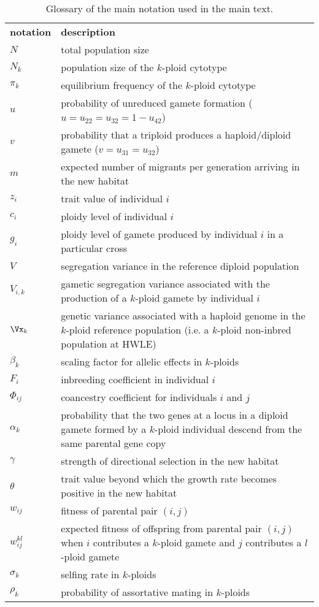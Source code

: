 \documentclass[unnumsec,webpdf,modern,large]{_oup-authoring-template}
\theoremstyle{thmstyleone}%
\theoremstyle{thmstyletwo}%
\theoremstyle{thmstylethree}%
\begin{document}
\begin{table}[t]
\caption{Glossary of the main notation used in the main text.
} \label{tbl:glossary}
\centering
\small
\begin{tabularx}{\linewidth}{lX}
\cline{1-2}
\textbf{notation}   & \textbf{description}   \\ \cline{1-2}
$N$ & total population size\\
$N_k$ & population size of the $k$-ploid cytotype \\
$\pi_k$ & equilibrium frequency of the $k$-ploid cytotype \\
$u$ & probability of unreduced gamete formation ($u=u_{22}=u_{32}=1-u_{42}$)\\
$v$ & probability that a triploid produces a haploid/diploid gamete
  ($v=u_{31}=u_{32}$)\\
$m$ & expected number of migrants per generation arriving in the new habitat \\
$z_i$ & trait value of individual $i$ \\
$c_i$ & ploidy level of individual $i$ \\
$g_i$ & ploidy level of gamete produced by individual $i$ in a particular cross\\
$V$ & segregation variance in the reference diploid population \\
$V_{i,k}$ & gametic segregation variance associated with the production of a
  $k$-ploid gamete by individual $i$ \\
$\Vx_k$ & genetic variance associated with a haploid genome in the $k$-ploid
  reference population (i.e. a $k$-ploid non-inbred population at HWLE) \\
$\beta_{k}$ & scaling factor for allelic effects in $k$-ploids \\
$F_i$ & inbreeding coefficient in individual $i$ \\
$\Phi_{ij}$ & coancestry coefficient for individuals $i$ and $j$ \\
$\alpha_k$ & probability that the two genes at a locus in a diploid gamete
  formed by a $k$-ploid individual descend from the same parental gene copy\\
$\gamma$ & strength of directional selection in the new habitat\\
$\theta$ & trait value beyond which the growth rate becomes positive in the new
habitat \\ $w_{ij}$ & fitness of parental pair $(i,j)$ \\
$w_{ij}^{kl}$ & expected fitness of offspring from parental pair $(i,j)$ when
$i$ contributes a $k$-ploid gamete and $j$ contributes a $l$-ploid gamete \\
$\sigma_k$ & selfing rate in $k$-ploids \\
$\rho_k$ & probability of assortative mating in $k$-ploids \\
\cline{1-2}
\end{tabularx}%
\end{table}
\end{document}
